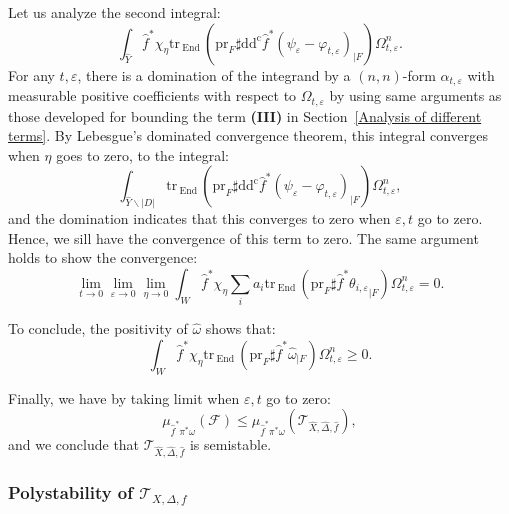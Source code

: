 \documentclass[12pt,a4paper]{amsart}
\newcommand{\End}{\mathrm{End}\,}
\newcommand{\ddc}{\mathrm{dd^c}}
\newcommand{\tr}{\mathrm{tr}\,}
\theoremstyle{plain}
\theoremstyle{definition}
\begin{document}
Let us analyze the second integral:
$$
\int_{\widehat{Y}} \widehat{f}^*\chi_\eta \tr_\End(\mathrm{pr}_F \sharp \ddc \widehat{f}^*(\psi_\varepsilon - \varphi_{t, \varepsilon})_{|F}) \Omega_{t, \varepsilon}^n.
$$
For any $t, \varepsilon$, there is a domination of the integrand by a $(n,n)$-form $\alpha_{t, \varepsilon}$ with measurable positive coefficients with respect to $\Omega_{t, \varepsilon}$ by using same arguments as those developed for bounding the term \textbf{(III)} in Section~\ref{Analysis of different terms}. By Lebesgue's dominated convergence theorem, this integral converges when $\eta$ goes to zero, to the integral:
$$
\int_{\widehat{Y} \backslash |D|} \tr_\End(\mathrm{pr}_F \sharp \ddc \widehat{f}^*(\psi_\varepsilon - \varphi_{t, \varepsilon})_{|F}) \Omega_{t, \varepsilon}^n,
$$
and the domination indicates that this converges to zero when $\varepsilon, t$ go to zero. Hence, we sill have the convergence of this term to zero. The same argument holds to show the convergence:
$$
 \lim_{t \to 0} \lim_{\varepsilon \to 0} \lim_{\eta \to 0} \int_{W} \widehat{f}^*\chi_\eta \sum_i a_i \tr_\End(\mathrm{pr}_F {\sharp \widehat{f}^*\theta_{i, \varepsilon}}_{|F}) \Omega_{t, \varepsilon}^{n} = 0.
$$

To conclude, the positivity of $\widehat{\omega}$ shows that:
$$
\int_{W} \widehat{f}^*\chi_\eta \tr_\End(\mathrm{pr}_F \sharp \widehat{f}^*\widehat{\omega}_{|F} ) \Omega_{t, \varepsilon}^{n} \geq 0.
$$

Finally, we have by taking limit when $\varepsilon, t$ go to zero:
$$
\mu_{\widehat{f}^*\pi^*\omega}(\mathcal{F}) \leq \mu_{\widehat{f}^*\pi^*\omega}(\mathcal{T}_{\widehat{X}, \widehat{\Delta}, \widehat{f}}),
$$
and we conclude that $\mathcal{T}_{\widehat{X}, \widehat{\Delta}, \widehat{f}}$ is semistable.

\subsubsection{Polystability of $\mathcal{T}_{X, \Delta, f}$}\label{Polystability of the adapted tangent sheaf}
\end{document}

